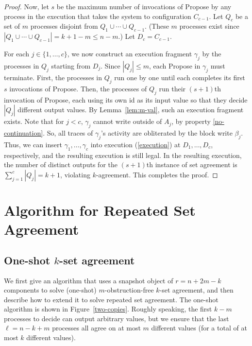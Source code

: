 \documentclass[11pt]{article}
\begin{document}
\begin{proof}
\smallskip

Now, let $s$ be the maximum number of invocations of {\sc Propose} by any process in the execution that takes the system to configuration $C_{c-1}$.
Let $Q_c$ be a set of $m$ processes disjoint from $Q_1\cup\cdots \cup Q_{c-1}$.
(These $m$ processes exist since $|Q_1\cup \cdots\cup Q_{c-1}| = k+1-m \leq n-m$.)
Let $D_c=C_{c-1}$.

For each $j\in\{1,\ldots,c\}$, we now construct an execution fragment $\gamma_j$
by the processes in $Q_j$ starting from $D_j$.
Since $|Q_j|\leq m$, each {\sc Propose} in $\gamma_j$ must terminate.
First, the processes in $Q_j$ run one by one until each
completes its first $s$ invocations of {\sc Propose}.
Then, the processes of $Q_j$ run their $(s+1)$th invocation of {\sc Propose},
each using its own id as its input value so that they decide $|Q_j|$ different output values.  
By Lemma~\ref{lem:m-val}, such an execution fragment exists.
Note that for $j<c$, $\gamma_j$ cannot write outside of $A_j$, by property \ref{no-continuation}.  So, all traces of $\gamma_j$'s activity are obliterated by the block
write $\beta_j$.  Thus, we can insert $\gamma_1,\ldots,\gamma_{c}$ into
execution (\ref{execution}) at $D_1,\ldots,D_c$, respectively, 
and the resulting execution
is still legal.  In the resulting execution, the number of distinct outputs
for the $(s+1)$th instance of set agreement is $\sum\limits_{j=1}^c|Q_j| = k+1$, violating $k$-agreement.
This completes the proof.
\end{proof}


\section{Algorithm for Repeated Set Agreement}
\label{linear-space-alg}

\subsection{One-shot $k$-set agreement}
We first give an 
algorithm that uses a snapshot object of $r=n+2m-k$ components to solve 
(one-shot) $m$-obstruction-free $k$-set agreement, and then describe
how to extend it to solve repeated set agreement.
The one-shot algorithm is shown in Figure~\ref{two-copies}.
Roughly speaking, the first $k-m$ processes to decide
can output arbitrary values, but we ensure that the last $\ell=n-k+m$ processes
all agree on at most $m$ different values (for a total of at most $k$ different values).
\end{document}
